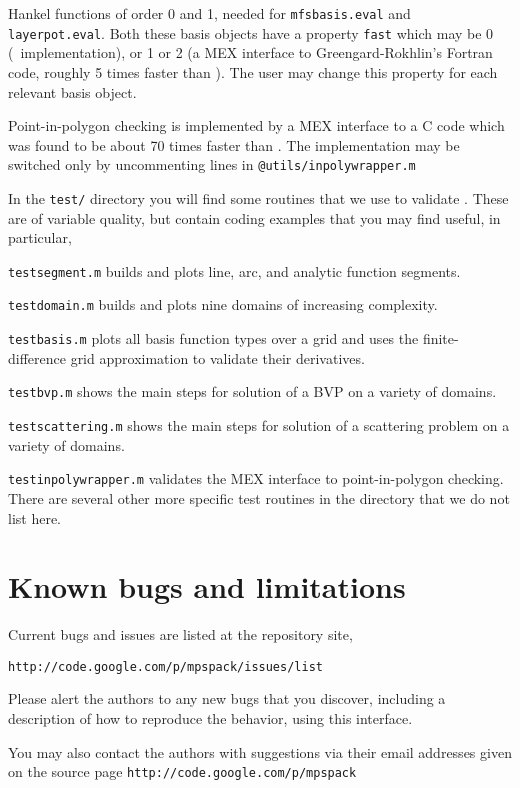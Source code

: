 \documentclass[12pt]{article}
\begin{document}
\item Hankel functions of order 0 and 1, needed for
{\tt mfsbasis.eval} and {\tt layerpot.eval}. Both these basis objects
have a property {\tt fast} which may be 0 (\matlab\ implementation),
or 1 or 2 (a MEX interface to Greengard-Rokhlin's Fortran code,
roughly 5 times faster than \matlab).
The user may change this property for each relevant basis object.

\item Point-in-polygon checking is implemented by a MEX interface
to a C code which was found to be about 70 times faster than
\matlab. The implementation
may be switched only by uncommenting lines
in {\tt @utils/inpolywrapper.m}
\een

In the {\tt test/} directory you will find some routines that
we use to validate \mpspack. These are of variable quality,
but contain coding examples that you may find useful, in particular,
\bi
\item {\tt testsegment.m} builds and plots line, arc, and analytic function
segments.
\item {\tt testdomain.m} builds and plots nine domains of increasing
complexity.
\item {\tt testbasis.m} plots all basis function types over a grid and
uses the finite-difference grid approximation to validate their derivatives.
\item {\tt testbvp.m} shows the main steps for solution of a BVP on
a variety of domains.
\item {\tt testscattering.m} shows the main steps for solution of a 
scattering problem on a variety of domains.
\item {\tt testinpolywrapper.m} validates the MEX interface to point-in-polygon
checking.
\ei
There are several other more specific test routines in the directory
that we do not list here.

\section{Known bugs and limitations}

Current bugs and issues are listed at the repository site,

{\tt http://code.google.com/p/mpspack/issues/list}

Please alert the authors to any new
bugs that you discover, including a description
of how to reproduce the behavior, using this interface.

You may also contact the authors with suggestions
via their email addresses
given on the source page {\tt http://code.google.com/p/mpspack}
\end{document}
